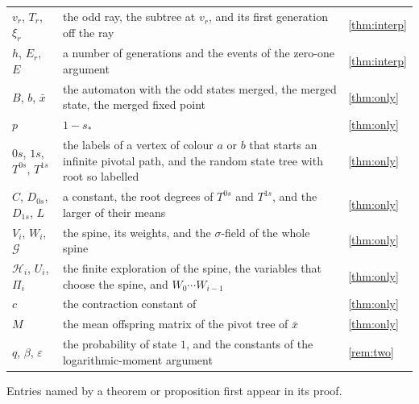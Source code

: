 \begin{center}
\begin{tabular}{@{}lp{}l@{}}
$v_r$, $T_r$, $\xi_r$ & the odd ray, the subtree at $v_r$, and its first generation off the ray & \cref{thm:interp}\\
$h$, $E_r$, $E$ & a number of generations and the events of the zero-one argument & \cref{thm:interp}\\
$B$, $b$, $\bar x$ & the automaton with the odd states merged, the merged state, the merged fixed point & \cref{thm:only}\\
$p$ & $1-s_*$ & \cref{thm:only}\\
$0s$, $1s$, $T^{0s}$, $T^{1s}$ & the labels of a vertex of colour $a$ or $b$ that starts an infinite pivotal path, and the random state tree with root so labelled \cite[Section~4]{JPS} & \cref{thm:only}\\
$C$, $D_{0s}$, $D_{1s}$, $L$ & a constant, the root degrees of $T^{0s}$ and $T^{1s}$, and the larger of their means & \cref{thm:only}\\
$V_i$, $W_i$, $\mathcal G$ & the spine, its weights, and the $\sigma$-field of the whole spine \cite[Section~4]{JPS} & \cref{thm:only}\\
$\mathcal H_i$, $U_i$, $\Pi_i$ & the finite exploration of the spine, the variables that choose the spine, and $W_0\cdots W_{i-1}$ & \cref{thm:only}\\
$c$ & the contraction constant of \cite[Lemma~4.12]{JPS} & \cref{thm:only}\\
$M$ & the mean offspring matrix of the pivot tree of $\bar x$ & \cref{thm:only}\\
$q$, $\beta$, $\varepsilon$ & the probability of state $1$, and the constants of the logarithmic-moment argument & \cref{rem:two}\\
\bottomrule
\end{tabular}
\end{center}
Entries named by a theorem or proposition first appear in its proof.
